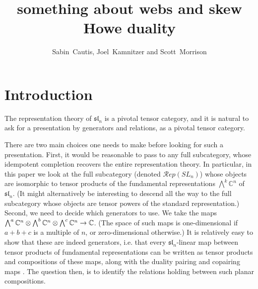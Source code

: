 \documentclass[11pt,leqno]{article}
\title{something about webs and skew Howe duality}
\author{Sabin~Cautis, Joel~Kamnitzer and Scott~Morrison}
\begin{document}
\makeatletter
{}
\gdef\theequation{\thesection.\arabic{equation}}
\makeatother

\maketitle

\begin{abstract}
\end{abstract}


\tableofcontents


\newcommand{\alt}{\wedge}

\newcommand{\Alt}{\bigwedge}

\renewcommand{\sl}[1]{\mathfrak{sl}_{#1}}
\newcommand{\Usl}[1]{U\sl{#1}}

\newcommand{\one}{1}

\newcommand{\gl}[1]{\mathfrak{gl}_{#1}}
\newcommand{\Ugl}[1]{U\gl{#1}}

\newcommand{\ul}[1]{{\underline{#1}}}

\newcommand{\RepSL}[1]{\mathcal{R}ep(SL_{#1})}
\newcommand{\Lad}{\mathcal{L}ad}

\section{Introduction}
The representation theory of $\sl{n}$ is a pivotal tensor category, and it is natural to ask for a presentation by generators and relations, as a pivotal tensor category.

There are two main choices one needs to make before looking for such a presentation. First, it would be reasonable to pass to any full subcategory, whose idempotent completion recovers the entire representation theory. In particular, in this paper we look at the full subcategory (denoted $\RepSL{n}$) whose objects are isomorphic to tensor products of the fundamental representations $\Alt^k \mathbb C^n$ of $\sl{n}$. (It might alternatively be interesting to descend all the way to the full subcategory whose objects are tensor powers of the standard representation.) Second, we need to decide which generators to use. We take the maps $\Alt^a \mathbb{C}^n \tensor \Alt^b \mathbb{C}^n \tensor \Alt^c \mathbb{C}^n \to \mathbb{C}$. (The space of such maps is one-dimensional if $a+b+c$ is a multiple of $n$, or zero-dimensional otherwise.) It is relatively easy to show that these are indeed generators, i.e. that every $\sl{n}$-linear map between tensor products of fundamental representations can be written as tensor products and compositions of these maps, along with the duality pairing and copairing maps \cite[Proposition 3.5.8]{0704.1503}. The question then, is to identify the relations holding between such planar compositions.
\end{document}
